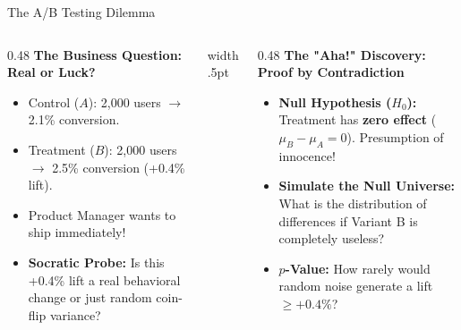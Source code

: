 \documentclass[../m00-session-03.tex]{subfiles}
\begin{document}
\begin{frame}[fragile]{The A/B Testing Dilemma}
  \begin{columns}[T,onlytextwidth]
    \begin{column}{0.48\textwidth}
      {\small\bfseries\color{UpGradRed}The Business Question: Real or Luck?}\par\vspace{0.08cm}
      \begin{itemize}\setlength{\itemsep}{0.20em}\small
        \item Control ($A$): 2,000 users $\to$ 2.1\% conversion.
        \item Treatment ($B$): 2,000 users $\to$ 2.5\% conversion (+0.4\% lift).
        \item Product Manager wants to ship immediately!
        \item \textcolor{UpGradRed}{\textbf{Socratic Probe:}} Is this +0.4\% lift a real behavioral change or just random coin-flip variance?
      \end{itemize}
    \end{column}
    \hfill{\color{UpGradRule}\vrule width .5pt}\hfill
    \begin{column}{0.48\textwidth}
      {\small\bfseries\color{AWSEmerald}The "Aha!" Discovery: Proof by Contradiction}\par\vspace{0.08cm}
      \begin{itemize}\setlength{\itemsep}{0.18em}\small
        \item \textbf{Null Hypothesis ($H_0$):} Treatment has \textbf{zero effect} ($\mu_B - \mu_A = 0$). Presumption of innocence!
        \item \textbf{Simulate the Null Universe:} What is the distribution of differences if Variant B is completely useless?
        \item \textbf{$p$-Value:} How rarely would random noise generate a lift $\ge +0.4\%$?
      \end{itemize}
      \vspace{0.04cm}
    \end{column}
  \end{columns}
\end{frame}
\end{document}
